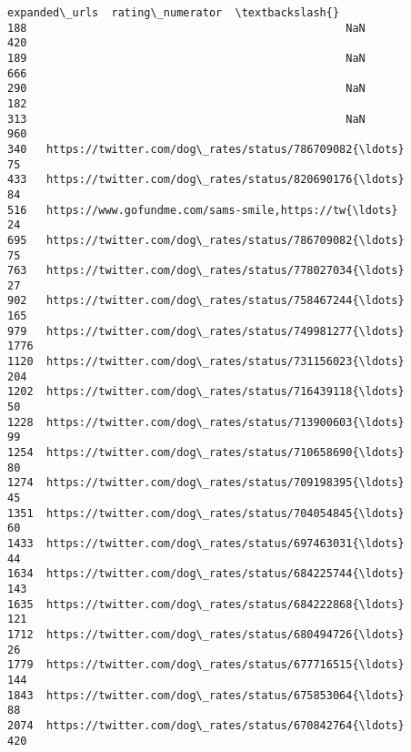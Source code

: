 \documentclass[11pt]{article}
\begin{document}
\begin{tcolorbox}[breakable, size=fbox, boxrule=.5pt, pad at break*=1mm, opacityfill=0]
\begin{Verbatim}[commandchars=\\\{\}]
                                          expanded\_urls  rating\_numerator  \textbackslash{}
188                                                 NaN               420
189                                                 NaN               666
290                                                 NaN               182
313                                                 NaN               960
340   https://twitter.com/dog\_rates/status/786709082{\ldots}                75
433   https://twitter.com/dog\_rates/status/820690176{\ldots}                84
516   https://www.gofundme.com/sams-smile,https://tw{\ldots}                24
695   https://twitter.com/dog\_rates/status/786709082{\ldots}                75
763   https://twitter.com/dog\_rates/status/778027034{\ldots}                27
902   https://twitter.com/dog\_rates/status/758467244{\ldots}               165
979   https://twitter.com/dog\_rates/status/749981277{\ldots}              1776
1120  https://twitter.com/dog\_rates/status/731156023{\ldots}               204
1202  https://twitter.com/dog\_rates/status/716439118{\ldots}                50
1228  https://twitter.com/dog\_rates/status/713900603{\ldots}                99
1254  https://twitter.com/dog\_rates/status/710658690{\ldots}                80
1274  https://twitter.com/dog\_rates/status/709198395{\ldots}                45
1351  https://twitter.com/dog\_rates/status/704054845{\ldots}                60
1433  https://twitter.com/dog\_rates/status/697463031{\ldots}                44
1634  https://twitter.com/dog\_rates/status/684225744{\ldots}               143
1635  https://twitter.com/dog\_rates/status/684222868{\ldots}               121
1712  https://twitter.com/dog\_rates/status/680494726{\ldots}                26
1779  https://twitter.com/dog\_rates/status/677716515{\ldots}               144
1843  https://twitter.com/dog\_rates/status/675853064{\ldots}                88
2074  https://twitter.com/dog\_rates/status/670842764{\ldots}               420


\end{Verbatim}
\end{tcolorbox}
\end{document}
